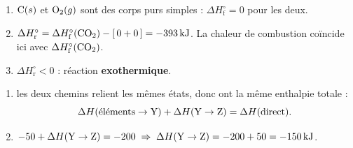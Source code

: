 \documentclass[11pt,a4paper]{article}
\begin{document}
\begin{corrige}
\begin{enumerate}[label=\alph*)]
  \item $\ce{C}(s)$ et $\ce{O2}(g)$ sont des corps purs simples : $\Delta H^\circ_{\text{f}}=0$ pour les deux.
  \item $\Delta H^\circ_{\text{r}} = \Delta H^\circ_{\text{f}}(\ce{CO2}) - [\,0 + 0\,] = \qty{-393}{\kilo\joule}$. La chaleur de combustion coïncide ici avec $\Delta H^\circ_{\text{f}}(\ce{CO2})$.
  \item $\Delta H^\circ_{\text{r}}<0$ : réaction \textbf{exothermique}.
\end{enumerate}
\end{corrige}

\begin{corrige}
\begin{enumerate}[label=\alph*)]
  \item les deux chemins relient les mêmes états, donc ont la même enthalpie totale :
  \[ \Delta H(\text{éléments}\rightarrow\ce{Y}) + \Delta H(\ce{Y}\rightarrow\ce{Z}) = \Delta H(\text{direct}). \]
  \item $-50 + \Delta H(\ce{Y}\rightarrow\ce{Z}) = -200 \;\Rightarrow\; \Delta H(\ce{Y}\rightarrow\ce{Z}) = -200 + 50 = \qty{-150}{\kilo\joule}$.
\end{enumerate}
\end{corrige}
\end{document}
